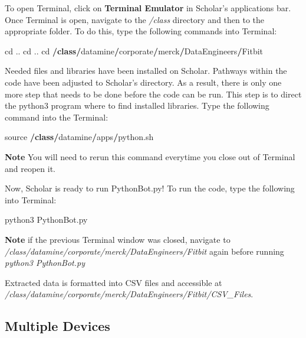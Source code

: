 \documentclass[]{book}
\newenvironment{Shaded}{\begin{snugshade}}{\end{snugshade}}
\newcommand{\KeywordTok}[1]{\textcolor[rgb]{0.13,0.29,0.53}{\textbf{#1}}}
\newcommand{\NormalTok}[1]{#1}
\newcommand{\OperatorTok}[1]{\textcolor[rgb]{0.81,0.36,0.00}{\textbf{#1}}}
\begin{document}
To open Terminal, click on \textbf{Terminal Emulator} in Scholar's applications bar. Once Terminal is open, navigate to the \emph{/class} directory and then to the appropriate folder. To do this, type the following commands into Terminal:

\begin{Shaded}
\begin{Highlighting}[]
\NormalTok{cd ..}
\NormalTok{cd ..}
\NormalTok{cd }\OperatorTok{/}\KeywordTok{class}\OperatorTok{/}\NormalTok{datamine}\OperatorTok{/}\NormalTok{corporate}\OperatorTok{/}\NormalTok{merck}\OperatorTok{/}\NormalTok{DataEngineers}\OperatorTok{/}\NormalTok{Fitbit}
\end{Highlighting}
\end{Shaded}

Needed files and libraries have been installed on Scholar. Pathways within the code have been adjusted to Scholar's directory. As a result, there is only one more step that needs to be done before the code can be run. This step is to direct the python3 program where to find installed libraries. Type the following command into the Terminal:

\begin{Shaded}
\begin{Highlighting}[]
\NormalTok{source }\OperatorTok{/}\KeywordTok{class}\OperatorTok{/}\NormalTok{datamine}\OperatorTok{/}\NormalTok{apps}\OperatorTok{/}\NormalTok{python.sh}
\end{Highlighting}
\end{Shaded}

\textbf{Note} You will need to rerun this command everytime you close out of Terminal and reopen it.

Now, Scholar is ready to run PythonBot.py! To run the code, type the following into Terminal:

\begin{Shaded}
\begin{Highlighting}[]
\NormalTok{python3 PythonBot.py}
\end{Highlighting}
\end{Shaded}

\textbf{Note} if the previous Terminal window was closed, navigate to \emph{/class/datamine/corporate/merck/DataEngineers/Fitbit} again before running \emph{python3 PythonBot.py}

Extracted data is formatted into CSV files and accessible at \emph{/class/datamine/corporate/merck/DataEngineers/Fitbit/CSV\_Files}.

\hypertarget{multiple-devices}{%
\subsection{Multiple Devices}\label{multiple-devices}}
\end{document}
